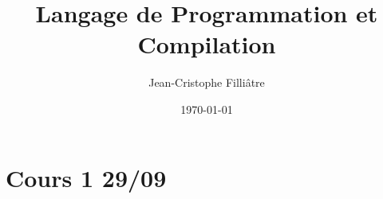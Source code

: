\documentclass{cours}
\title{Langage de Programmation et Compilation}
\author{Jean-Cristophe Filliâtre}
\date{\today}
\begin{document}
\part{Cours 1 29/09}
\end{document}
